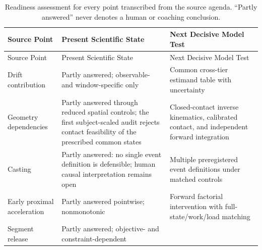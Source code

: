 \documentclass[
  letterpaper,
]{report}
\begin{document}
\begin{longtable}[]{@{}
  >{\raggedright\arraybackslash}p{}
  >{\raggedright\arraybackslash}p{}
  >{\raggedright\arraybackslash}p{}@{}}
\caption{Readiness assessment for every point transcribed from the
source agenda. ``Partly answered'' never denotes a human or coaching
conclusion. }\label{tbl-momentum-source-readiness}\tabularnewline
\toprule\noalign{}
\begin{minipage}[b]{\linewidth}\raggedright
Source Point
\end{minipage} & \begin{minipage}[b]{\linewidth}\raggedright
Present Scientific State
\end{minipage} & \begin{minipage}[b]{\linewidth}\raggedright
Next Decisive Model Test
\end{minipage} \\
\midrule\noalign{}
\endfirsthead
\toprule\noalign{}
\begin{minipage}[b]{\linewidth}\raggedright
Source Point
\end{minipage} & \begin{minipage}[b]{\linewidth}\raggedright
Present Scientific State
\end{minipage} & \begin{minipage}[b]{\linewidth}\raggedright
Next Decisive Model Test
\end{minipage} \\
\midrule\noalign{}
\endhead
\bottomrule\noalign{}
\endlastfoot
Drift contribution & Partly answered; observable- and window-specific
only & Common cross-tier estimand table with uncertainty \\
Geometry dependencies & Partly answered through reduced spatial
controls; the first subject-scaled audit rejects contact feasibility of
the prescribed common states & Closed-contact inverse kinematics,
calibrated contact, and independent forward integration \\
Casting & Partly answered: no single event definition is defensible;
human causal interpretation remains open & Multiple preregistered event
definitions under matched controls \\
Early proximal acceleration & Partly answered pointwise; nonmonotonic &
Forward factorial intervention with full-state/work/load matching \\
Segment release & Partly answered; objective- and constraint-dependent &

\end{longtable}
\end{document}
